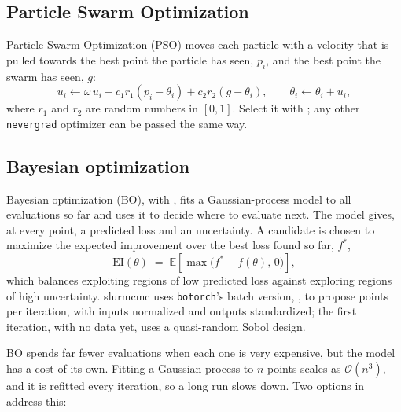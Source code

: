 \subsection{Particle Swarm Optimization}

Particle Swarm Optimization (PSO) moves each particle with a velocity that is pulled towards the
best point the particle has seen, $p_i$, and the best point the swarm has seen, $g$:
\begin{equation}
  u_i \leftarrow \omega\, u_i + c_1 r_1 (p_i - \theta_i) + c_2 r_2 (g - \theta_i),
  \qquad
  \theta_i \leftarrow \theta_i + u_i,
\end{equation}
where $r_1$ and $r_2$ are random numbers in $[0,1]$. Select it with
; any other \texttt{nevergrad}
optimizer can be passed the same way.

\subsection{Bayesian optimization}

Bayesian optimization (BO), with , fits a Gaussian-process model
to all evaluations so far and uses it to decide where to evaluate next. The model gives, at every
point, a predicted loss and an uncertainty. A candidate is chosen to maximize the expected
improvement over the best loss found so far, $f^\ast$,
\begin{equation}
  \mathrm{EI}(\theta) \;=\; \mathbb{E}\!\left[\max\!\big(f^\ast - f(\theta),\, 0\big)\right],
\end{equation}
which balances exploiting regions of low predicted loss against exploring regions of high
uncertainty. slurmcmc uses \texttt{botorch}'s batch version, , to
propose  points per iteration, with inputs normalized and outputs standardized;
the first iteration, with no data yet, uses a quasi-random Sobol design.

BO spends far fewer evaluations when each one is very expensive, but the model has a cost of its
own. Fitting a Gaussian process to $n$ points scales as $\mathcal{O}(n^3)$, and it is refitted every
iteration, so a long run slows down. Two options in  address this:

